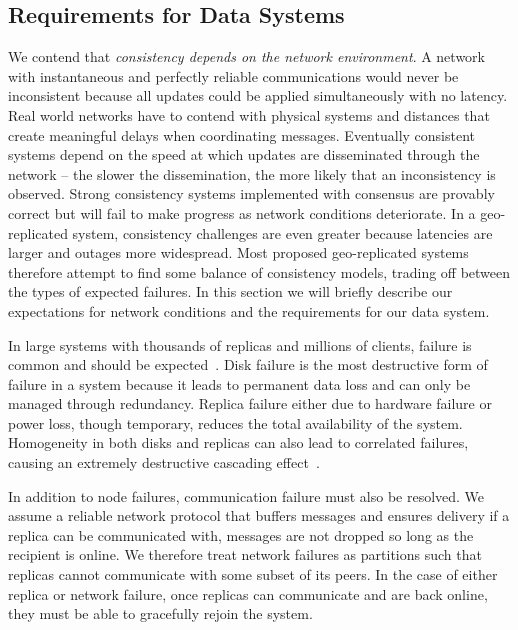 \subsection{Requirements for Data Systems}
\label{ch02_requirements}

We contend that \emph{consistency depends on the network environment}.
A network with instantaneous and perfectly reliable communications would never be inconsistent because all updates could be applied simultaneously with no latency.
Real world networks have to contend with physical systems and distances that create meaningful delays when coordinating messages.
Eventually consistent systems depend on the speed at which updates are disseminated through the network -- the slower the dissemination, the more likely that an inconsistency is observed.
Strong consistency systems implemented with consensus are provably correct but will fail to make progress as network conditions deteriorate.
In a geo-replicated system, consistency challenges are even greater because latencies are larger and outages more widespread.
Most proposed geo-replicated systems~\cite{redblue,hat,wren,walter,eiger,alvaro2013consistency} therefore attempt to find some balance of consistency models, trading off between the types of expected failures.
In this section we will briefly describe our expectations for network conditions and the requirements for our data system.

In large systems with thousands of replicas and millions of clients, failure is common and should be expected~\cite{node_failure}.
Disk failure is the most destructive form of failure in a system because it leads to permanent data loss and can only be managed through redundancy.
Replica failure either due to hardware failure or power loss, though temporary, reduces the total availability of the system.
Homogeneity in both disks and replicas can also lead to correlated failures, causing an extremely destructive cascading effect~\cite{f4}.

In addition to node failures, communication failure must also be resolved.
We assume a reliable network protocol that buffers messages and ensures delivery if a replica can be communicated with, messages are not dropped so long as the recipient is online.
We therefore treat network failures as partitions such that replicas cannot communicate with some subset of its peers.
In the case of either replica or network failure, once replicas can communicate and are back online, they must be able to gracefully rejoin the system.

